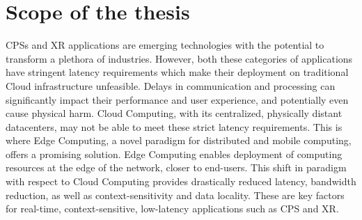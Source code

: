 \section{Scope of the thesis}
\glsresetall%











\glsresetall%
\glspl{CPS} and \gls{XR} applications are emerging technologies with the potential to transform a plethora of industries.
However, both these categories of applications have stringent latency requirements which make their deployment on traditional Cloud infrastructure unfeasible.
Delays in communication and processing can significantly impact their performance and user experience, and potentially even cause physical harm.
Cloud Computing, with its centralized, physically distant datacenters, may not be able to meet these strict latency requirements.
This is where Edge Computing, a novel paradigm for distributed and mobile computing, offers a promising solution.
Edge Computing enables deployment of computing resources at the edge of the network, closer to end-users.
This shift in paradigm with respect to Cloud Computing provides drastically reduced latency, bandwidth reduction, as well as context-sensitivity and data locality.
These are key factors for real-time, context-sensitive, low-latency applications such as \gls{CPS} and \gls{XR}.

